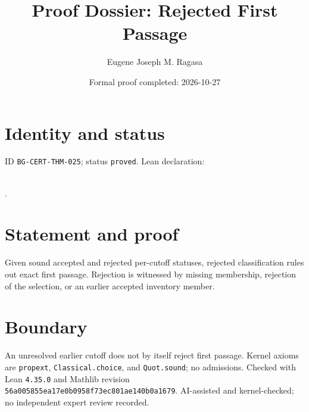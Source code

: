 \documentclass[11pt]{article}
\title{Proof Dossier: Rejected First Passage}\author{Eugene Joseph M. Ragasa}\date{Formal proof completed: 2026-10-27}
\begin{document}
\maketitle
\section{Identity and status}
ID \texttt{BG-CERT-THM-025}; status \texttt{proved}. Lean declaration:
\par{}\\
{\tiny{}}.
\section{Statement and proof}
Given sound accepted and rejected per-cutoff statuses, rejected classification rules out
exact first passage. Rejection is witnessed by missing membership, rejection of the
selection, or an earlier accepted inventory member.
\section{Boundary}
An unresolved earlier cutoff does not by itself reject first passage. Kernel axioms are
\texttt{propext}, \texttt{Classical.choice}, and \texttt{Quot.sound}; no admissions.
Checked with Lean \texttt{4.35.0} and Mathlib revision
\texttt{56a005855ea17e0b0958f73ec801ae140b0a1679}. AI-assisted and kernel-checked;
no independent expert review recorded.
\end{document}

